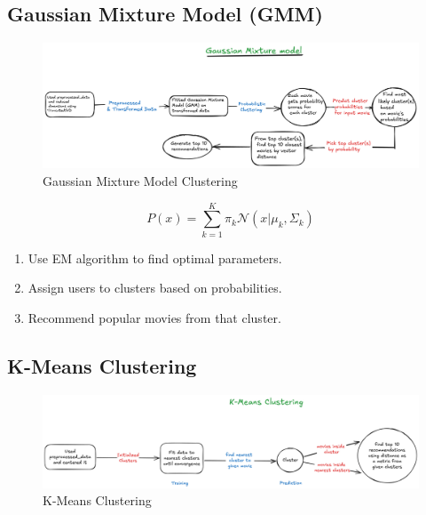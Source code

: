\documentclass[a4paper]{article}
\theoremstyle{plain}
\begin{document}
\subsection{Gaussian Mixture Model (GMM)}
\begin{figure}[H]
    \centering
    \includegraphics[width=\linewidth]{gmm.png}
    \caption{Gaussian Mixture Model Clustering}
    \label{fig:gmm}
\end{figure}

\[
P(x) = \sum_{k=1}^{K} \pi_k \mathcal{N}(x|\mu_k, \Sigma_k)
\]

\begin{enumerate}
    \item Use EM algorithm to find optimal parameters.
    \item Assign users to clusters based on probabilities.
    \item Recommend popular movies from that cluster.
\end{enumerate}


\subsection{K-Means Clustering }
\begin{figure}[H]
    \centering
    \includegraphics[width=\linewidth]{clustering.png}
    \caption{K-Means Clustering}
    \label{fig:clustering}
\end{figure}
\end{document}
